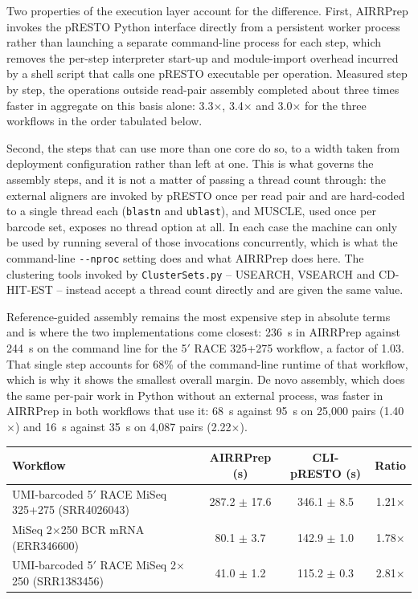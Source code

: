 \documentclass[11pt]{article}
\begin{document}
Two properties of the execution layer account for the difference. First,
AIRRPrep invokes the pRESTO Python interface directly from a persistent worker
process rather than launching a separate command-line process for each step,
which removes the per-step interpreter start-up and module-import overhead
incurred by a shell script that calls one pRESTO executable per operation.
Measured step by step, the operations outside read-pair assembly completed
about three times faster in aggregate on this basis alone: 3.3$\times$,
3.4$\times$ and 3.0$\times$ for the three workflows in the order tabulated
below.

Second, the steps that can use more than one core do so, to a width taken from
deployment configuration rather than left at one. This is what governs the
assembly steps, and it is not a matter of passing a thread count through: the
external aligners are invoked by pRESTO once per read pair and are hard-coded
to a single thread each (\texttt{blastn} and \texttt{ublast}), and MUSCLE, used
once per barcode set, exposes no thread option at all. In each case the machine
can only be used by running several of those invocations concurrently, which is
what the command-line \texttt{-{}-nproc} setting does and what AIRRPrep does
here. The clustering tools invoked by \texttt{ClusterSets.py} -- USEARCH,
VSEARCH and CD-HIT-EST -- instead accept a thread count directly and are given
the same value.

Reference-guided assembly remains the most expensive step in absolute terms and
is where the two implementations come closest: 236~s in AIRRPrep against 244~s
on the command line for the 5$'$ RACE 325+275 workflow, a factor of 1.03. That
single step accounts for 68\% of the command-line runtime of that workflow,
which is why it shows the smallest overall margin. De novo assembly, which does
the same per-pair work in Python without an external process, was faster in
AIRRPrep in both workflows that use it: 68~s against 95~s on 25,000 pairs
(1.40$\times$) and 16~s against 35~s on 4,087 pairs (2.22$\times$).

\begin{center}
\begin{tabular}{p{}ccc}
\toprule
\textbf{Workflow} &
\textbf{AIRRPrep (s)} &
\textbf{CLI-pRESTO (s)} &
\textbf{Ratio}
\\
\midrule

UMI-barcoded 5$'$ RACE MiSeq 325+275 (SRR4026043)
& 287.2 $\pm$ 17.6
& 346.1 $\pm$ 8.5
& 1.21$\times$
\\

MiSeq 2$\times$250 BCR mRNA (ERR346600)
& 80.1 $\pm$ 3.7
& 142.9 $\pm$ 1.0
& 1.78$\times$
\\

UMI-barcoded 5$'$ RACE MiSeq 2$\times$250 (SRR1383456)
& 41.0 $\pm$ 1.2
& 115.2 $\pm$ 0.3
& 2.81$\times$
\\

\bottomrule
\end{tabular}
\end{center}
\end{document}
